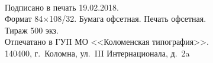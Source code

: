 \newpage
\thispagestyle{empty}
~
\vfill
\begin{minipage}{0.7\tw}
	\small
	Подписано в печать 19.02.2018.\\
	Формат 84$\times$108/32. Бумага офсетная. Печать офсетная.\\
	Тираж 500 экз.\\ 
	Отпечатано в ГУП МО <<Коломенская типография>>.\\ 140400, г.~Коломна, ул.~III Интернационала, д.~2a
\end{minipage}